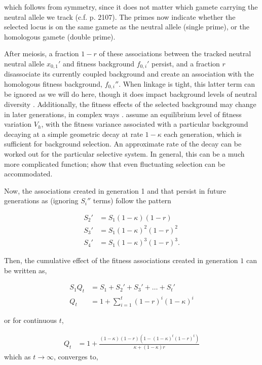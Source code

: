 \documentclass[11pt]{article}
\begin{document}
which follows from symmetry, since it does not matter which gamete carrying the
neutral allele we track (c.f. \cite{Santiago1998-bs} p. 2107). The primes now
indicate whether the selected locus is on the same gamete as the neutral
allele (single prime), or the homologous gamete (double prime).

After meiosis, a fraction $1-r$ of these associations between the tracked
neutral neutral allele $x_{0,1}'$ and fitness background $f_{0,i}'$ persist,
and a fraction $r$ disassociate its currently coupled background and create an
association with the homologous fitness background, $f_{0,i}''$. When linkage
is tight, this latter term can be ignored as we will do here, though it does
impact background levels of neutral diversity \parencite{Santiago1995-hx}.
Additionally, the fitness effects of the selected background may change in
later generations, in complex ways \parencite{Barton1986-yh,Turelli1990-kd}.
\textcite{Santiago1995-hx} assume an equilibrium level of fitness variation
$V_h$, with the fitness variance associated with a particular background
decaying at a simple geometric decay at rate $1-\kappa$ each generation, which
is sufficient for background selection. An approximate rate of the decay can be
worked out for the particular selective system. In general, this can be a much
more complicated function; \textcite{Buffalo2019-qs} show that even fluctuating
selection can be accommodated.

Now, the associations created in generation 1 and that persist in future
generations as (ignoring $S_i''$ terms) follow the pattern

\begin{align}
  S_{2}' &= S_1 (1-\kappa)(1-r) \\
  S_{3}' &= S_1 (1-\kappa)^2(1-r)^2 \\
  S_{4}' &= S_1 (1-\kappa)^3(1-r)^3.
\end{align}

Then, the cumulative effect of the fitness associations created in generation
$1$ can be written as,

\begin{align}
  \label{eq:qterm}
  S_1 Q_t &= S_1 + S_2' + S_3' + \ldots + S_t' \\
  Q_t &= 1 + \sum_{i=1}^t (1-r)^i(1-\kappa)^i
\end{align}

or for continuous $t$, 

\begin{align}
  \label{eq:q_t}
  Q_t &= 1+\frac{(1-\kappa) (1-r) \left(1-(1-\kappa)^t (1-r)^t\right)}{\kappa+(1-\kappa)r}
\end{align}
which as $t \to \infty$, converges to,
\end{document}
